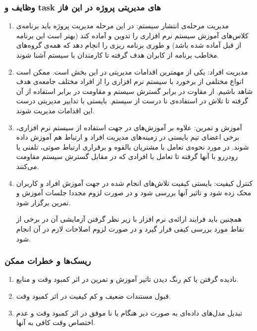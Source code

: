 \subsubsection{وظایف و task های مدیریتی پروژه در این فاز}
\begin{enumerate}
\item مدیریت مرحله‌ی انتشار سیستم:
\newline
در این مرحله مدیریت پروژه باید برنامه‌ی کلاس‌های آموزش سیستم نرم افزاری را تدوین و آماده کند (بهتر است این برنامه از قبل آماده شده باشد) و طوری برنامه ریزی را انجام دهد که همه‌ی گروه‌های مخاطب برنامه از کابران هدف گرفته تا کارمندان با سیستم آشنا شوند.
\item مدیریت افراد:
\newline
یکی از مهمترین اقدامات مدیریتی در این بخش است. ممکن است انواع مختلفی از برخورد با سیستم نرم افزاری را از افراد مختلف جامعه‌ی هدف شاهد باشیم. از مقاوت در برابر گسترش سیستم و مقاومت در برابر استفاده از آن گرفته تا تلاش در استفاده‌ی نا درست از سیستم. بایستی با تدابیر مدیریتی درست این اقدامات مدیریت شوند.
\item آموزش و تمرین:
\newline
علاوه بر آموزش‌های در جهت استفاده از سیستم نرم افزاری، برخی اعضای تیم بایستی در زمینه‌های مدیریت افراد و ارتباط هم آموزش داده شوند. در مورد نحوه‌ی تعامل با مشتریان بالقوه و برقراری ارتباط صوتی، تلفنی یا رودررو با آنها گرفته تا تعامل با افرادی که در مقابل گسترش سیستم مقاومت می‌کنند.
\item کنترل کیفیت:
\newline
بایستی کیفیت تلاش‌های انجام شده در جهت آموزش افراد و کاربران محک زده شود و تاثیر آنها بررسی شود و در صورت لزوم مجددا جلسات آموزش و تمرین برگزار شود.

همچنین باید فرایند ارائه‌ی نرم افزار با زیر نظر گرفتن آزمایشی آن در برخی از نقاط مورد بررسی کیفی قرار گیرد و در صورت لزوم اصلاحات لازم در آن انجام شود.

\end{enumerate}

\subsubsection{ریسک‌ها و خطرات ممکن}
\begin{enumerate}
\item نادیده گرفتن یا کم رنگ دیدن تاثیر آموزش و تمرین در اثر کمبود وقت و منابع.
\item قبول مستندات ضعیف و کم کیفیت در اثر کمبود وقت.
\item تبدیل مدل‌های داده‌ای به صورت دیر هنگام یا نا موفق در اثر کمبود وقت و عدم اختصاص وقت کافی به آنها.
\end{enumerate}

